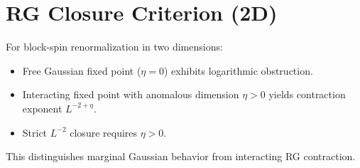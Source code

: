 \section*{RG Closure Criterion (2D)}

For block-spin renormalization in two dimensions:

\begin{itemize}
\item Free Gaussian fixed point ($\eta = 0$) exhibits logarithmic obstruction.
\item Interacting fixed point with anomalous dimension $\eta > 0$ yields contraction exponent $L^{-2+\eta}$.
\item Strict $L^{-2}$ closure requires $\eta > 0$.
\end{itemize}

This distinguishes marginal Gaussian behavior from interacting RG contraction.
